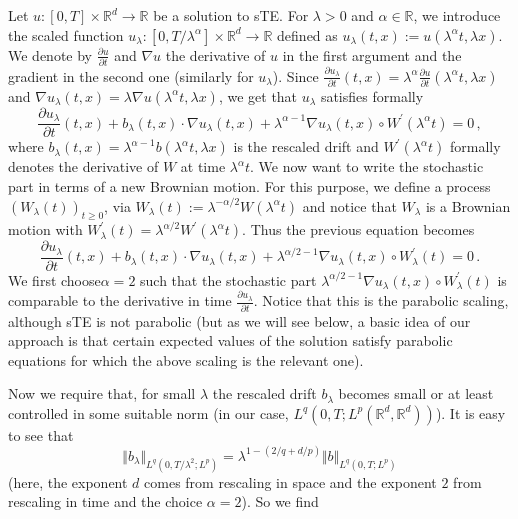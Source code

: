 \documentclass[a4paper,10pt]{article}
\begin{document}
Let $u \colon[ 0,T] \times\mathbb{R}^{d}\rightarrow\mathbb{R}$ be a
solution to sTE. For $\lambda>0$  and $\alpha \in \mathbb{R}$, we introduce the scaled function $u_{\lambda} \colon [ 0,T/\lambda^{\alpha}] \times\mathbb{R}^{d}\rightarrow\mathbb{R}$ defined as $u_{\lambda}(t,x):=u(\lambda^{\alpha }t,\lambda x)$. We denote by $\frac{\partial u}{\partial t}$ and $\nabla u$ the derivative of $u$ in the first argument and the gradient in the second one (similarly for $u_{\lambda}$). Since $\frac{\partial u_{\lambda}}{\partial
t}(t,x)=\lambda^{\alpha}\frac{\partial u}{\partial t}(\lambda^{\alpha
}t,\lambda x)$ and $\nabla u_{\lambda}(t,x)=\lambda\nabla u(\lambda^{\alpha
}t,\lambda x)$, we get that $u_{\lambda}$ satisfies formally 
\begin{equation*}
\frac{\partial u_{\lambda}}{\partial t}(t,x)+b_{\lambda}(t,x)\cdot\nabla
u_{\lambda}(t,x)+\lambda^{\alpha-1}\nabla u_{\lambda}(t,x)\circ W^{\prime
}(\lambda^{\alpha}t)=0 \,,
\end{equation*}
where $b_{\lambda}(t,x)=\lambda^{\alpha-1}b(\lambda^{\alpha}t,\lambda x)$ is the rescaled drift
and $W^{\prime}(\lambda^{\alpha}t)$ formally denotes the derivative of $W$ at time $\lambda^{\alpha}t$. We now want to write the stochastic part
in terms of a new Brownian motion. For this purpose, we define a process $(W_{\lambda
}(t))_{t\geq0}$, via $W_{\lambda}(t):=\lambda^{-\alpha
/2}W(\lambda^{\alpha}t)$ and notice that $W_{\lambda}$ is a Brownian motion
with $W_{\lambda}^{\prime}(t)=\lambda^{\alpha/2}W^{\prime}(\lambda^{\alpha}t)$. Thus the previous equation becomes
\begin{equation*}
\frac{\partial u_{\lambda}}{\partial t}(t,x)+b_{\lambda}(t,x)\cdot\nabla
u_{\lambda}(t,x)+\lambda^{\alpha/2-1}\nabla u_{\lambda}(t,x)\circ W_{\lambda
}^{\prime}(t)=0 \,.
\end{equation*}
We first choose$\alpha=2$ such that the stochastic part $\lambda^{\alpha
/2-1}\nabla u_{\lambda}(t,x)\circ W_{\lambda}^{\prime}(t)$ is comparable to
the derivative in time $\frac{\partial u_{\lambda}}{\partial t}$. Notice that this is the parabolic scaling, although sTE is not
parabolic (but as we will see below, a basic idea of our approach is that certain expected values of the solution satisfy parabolic equations for which the above scaling is the relevant one).

Now we require that, for small $\lambda$ the rescaled drift $b_{\lambda}$ becomes small or
at least controlled in some suitable norm (in our case, $L^{q}( 0,T;L^{p}(\mathbb{R}^{d},\mathbb{R}^{d}) )$).
It is easy to see that 
\begin{equation*}
\Vert b_{\lambda}\Vert_{L^{q}(0,T/\lambda^{2};L^{p})
}=\lambda^{1-(2/q+d/p)}\Vert b\Vert_{L^{q}(0,T;L^{p}) }
\end{equation*}
(here, the exponent $d$ comes from rescaling in space and the exponent $2$ from rescaling in time and the choice $\alpha =2$). So we find
\end{document}
